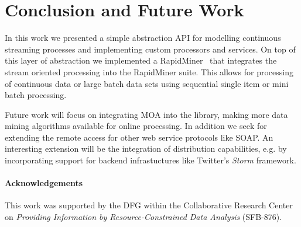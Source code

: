 \section{\label{sec:Outlook}Conclusion and Future Work}
In this work we presented a simple abstraction API for modelling
continuous streaming processes and implementing custom processors and
services. On top of this layer of abstraction we implemented a
RapidMiner \plugin\  that integrates the stream oriented processing into
the RapidMiner suite. This allows for processing of continuous data or
large batch data sets using sequential single item or mini batch
processing.
%
%

Future work will focus on integrating MOA into the \streams library,
making more data mining algorithms available for online processing. In
addition we seek for extending the remote access for other web service
protocols like SOAP. An interesting extension will be the integration
of distribution capabilities, e.g. by incorporating support for
backend infrastuctures like Twitter's {\em Storm} framework.

\paragraph{Acknowledgements} This work was supported by the DFG within
the Collaborative Research Center on {\em Providing Information by
  Resource-Constrained Data Analysis} (SFB-876).
